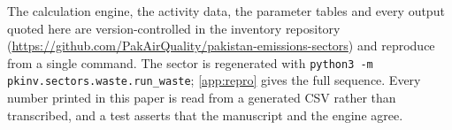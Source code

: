 \documentclass[5p,times,authoryear]{elsarticle}
\begin{document}
The calculation engine, the activity data, the parameter tables and every output quoted here
are version-controlled in the inventory repository
(\url{https://github.com/PakAirQuality/pakistan-emissions-sectors}) and reproduce from a single command. The sector is regenerated with
\texttt{python3 -m pkinv.sectors.waste.run\_waste}; \ref{app:repro} gives the full
sequence. Every number printed in this paper is read from a generated CSV rather than
transcribed, and a test asserts that the manuscript and the engine agree.




\appendix
\renewcommand{\thetable}{\arabic{table}}%
\renewcommand{\thefigure}{\arabic{figure}}%





\end{document}
